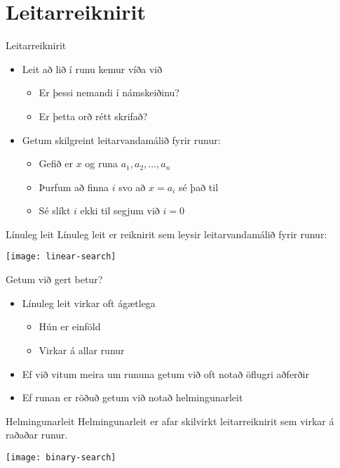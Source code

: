 \documentclass{beamer}
\begin{document}
\section{Leitarreiknirit}

\begin{frame}{Leitarreiknirit}
\begin{itemize}
 \item Leit að lið í runu kemur víða við
 \begin{itemize}
  \item Er þessi nemandi í námskeiðinu? 
  \item Er þetta orð rétt skrifað?
 \end{itemize}
 \item Getum skilgreint leitarvandamálið fyrir runur:
 \begin{itemize}
  \item Gefið er $x$ og runa $a_1, a_2, \ldots, a_n$
  \item Þurfum að finna $i$ svo að $x = a_i$ sé það til
  \item Sé slíkt $i$ ekki til segjum við $i = 0$
 \end{itemize}
\end{itemize}
\end{frame}

\begin{frame}{Línuleg leit}
Línuleg leit er reiknirit sem leysir leitarvandamálið fyrir runur:

\begin{center}
\texttt{[image: linear-search]}
\end{center}
\end{frame}

\begin{frame}{Getum við gert betur?}
\begin{itemize}
 \item Línuleg leit virkar oft ágætlega
 \begin{itemize}
  \item Hún er einföld
  \item Virkar á allar runur
 \end{itemize}
 \item Ef við vitum meira um rununa getum við oft notað öflugri aðferðir
 \item Ef runan er röðuð getum við notað helmingunarleit
\end{itemize}
\end{frame}

\begin{frame}{Helmingunarleit}
Helmingunarleit er afar skilvirkt leitarreiknirit sem virkar á raðaðar runur.

\begin{center}
\texttt{[image: binary-search]}
\end{center}
\end{frame}
\end{document}
